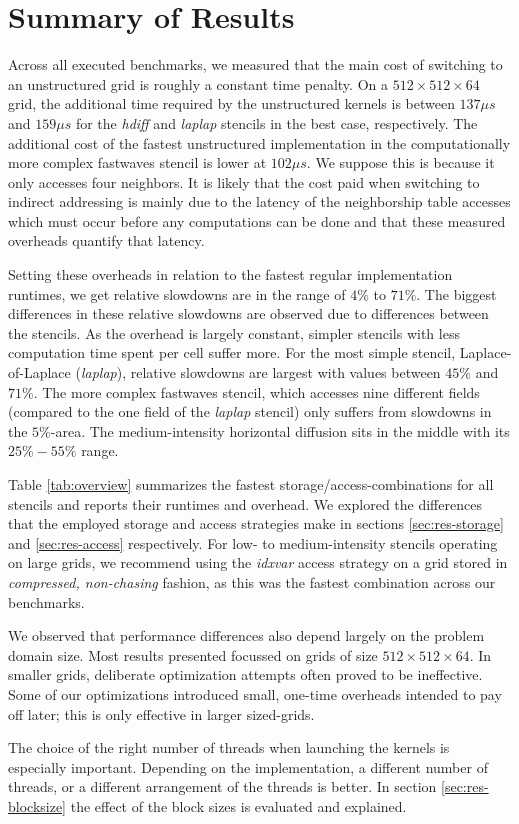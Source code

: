 \section{Summary of Results}

Across all executed benchmarks, we measured that the main cost of switching to an unstructured grid is roughly a constant time penalty. On a $512\times 512\times 64$ grid, the additional time required by the unstructured kernels is between $137 \mu s$ and $159 \mu s$ for the \emph{hdiff} and \emph{laplap} stencils in the best case, respectively. The additional cost of the fastest unstructured implementation in the computationally more complex fastwaves stencil is lower at $102 \mu s$. We suppose this is because it only accesses four neighbors. It is likely that the cost paid when switching to indirect addressing is mainly due to the latency of the neighborship table accesses which must occur before any computations can be done and that these measured overheads quantify that latency.

Setting these overheads in relation to the fastest regular implementation runtimes, we get relative slowdowns are in the range of $4\%$ to $71\%$. The biggest differences in these relative slowdowns are observed due to differences between the stencils. As the overhead is largely constant, simpler stencils with less computation time spent per cell suffer more. For the most simple stencil, Laplace-of-Laplace (\emph{laplap}), relative slowdowns are largest with values between $45\%$ and $71\%$. The more complex fastwaves stencil, which accesses nine different fields (compared to the one field of the \emph{laplap} stencil) only suffers from slowdowns in the $5\%$-area. The medium-intensity horizontal diffusion sits in the middle with its $25\% - 55\%$ range. 

Table \ref{tab:overview} summarizes the fastest storage/access-combinations for all stencils and reports their runtimes and overhead. We explored the differences that the employed storage and access strategies make in sections \ref{sec:res-storage} and \ref{sec:res-access} respectively. For low- to medium-intensity stencils operating on large grids, we recommend using the \emph{idxvar} access strategy on a grid stored in \emph{compressed, non-chasing} fashion, as this was the fastest combination across our benchmarks. 

We observed that performance differences also depend largely on the problem domain size. Most results presented focussed on grids of size $512\times 512\times 64$. In smaller grids, deliberate optimization attempts often proved to be ineffective. Some of our optimizations introduced small, one-time overheads intended to pay off later; this is only effective in larger sized-grids.

The choice of the right number of threads when launching the kernels is especially important. Depending on the implementation, a different number of threads, or a different arrangement of the threads is better. In section \ref{sec:res-blocksize} the effect of the block sizes is evaluated and explained.